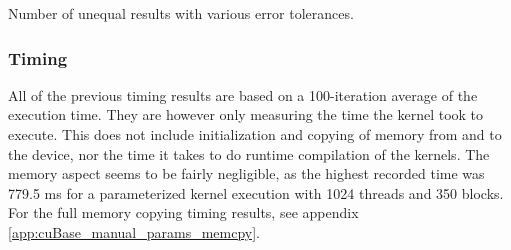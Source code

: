 \begin{table}[h!]
\centering
{}
\caption{Number of unequal results with various error tolerances.\label{table:errorComparison}}
\caption*{32 = single precision, 64 = double precision}
\end{table}

\subsubsection{Timing}
All of the previous timing results are based on a 100-iteration average of the execution time.
They are however only measuring the time the kernel took to execute.
This does not include initialization and copying of memory from and to the device, nor the time it takes to do runtime compilation of the kernels.
The memory aspect seems to be fairly negligible, as the highest recorded time was 779.5 ms for a parameterized kernel execution with 1024 threads and 350 blocks.
For the full memory copying timing results, see appendix \ref{app:cuBase_manual_params_memcpy}.

